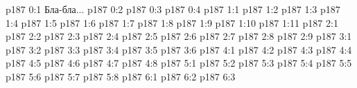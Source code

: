 \author{Промежуточные создания}
\vs p187 0:1  Бла-бла...
\vs p187 0:2 
\vs p187 0:3 
\vs p187 0:4 
\vs p187 1:1 
\vs p187 1:2 
\vs p187 1:3 
\vs p187 1:4 
\vs p187 1:5 \pc 
\vs p187 1:6 \pc 
\vs p187 1:7 
\vs p187 1:8 
\vs p187 1:9 
\vs p187 1:10 \pc 
\vs p187 1:11 \pc 
{}
\vs p187 2:1 
\vs p187 2:2 
\vs p187 2:3 
\vs p187 2:4 
\vs p187 2:5 
\vs p187 2:6 
\vs p187 2:7 
\vs p187 2:8 
\vs p187 2:9 \pc 
{}
\vs p187 3:1 
\vs p187 3:2 
\vs p187 3:3 
\vs p187 3:4 
\vs p187 3:5 
\vs p187 3:6 
\vs p187 4:1 
\vs p187 4:2 
\vs p187 4:3 \pc 
\vs p187 4:4 
\vs p187 4:5 \pc 
\vs p187 4:6 
\vs p187 4:7 \pc 
\vs p187 4:8 
\vs p187 5:1 
\vs p187 5:2 
\vs p187 5:3 \pc 
\vs p187 5:4 \pc 
\vs p187 5:5 
\vs p187 5:6 \pc 
\vs p187 5:7 \pc 
\vs p187 5:8 
\vs p187 6:1 
\vs p187 6:2 
\vs p187 6:3 
\quizlink
